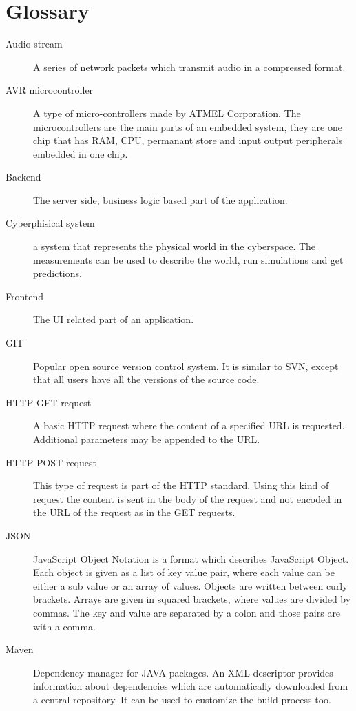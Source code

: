 \section{Glossary}
\begin{description}
	\item[Audio stream] A series of network packets which transmit audio in a compressed format.
	
	\item[AVR microcontroller] A type of micro-controllers made by ATMEL Corporation. The microcontrollers are the main parts of an embedded system, they are one chip that has RAM, CPU, permanant store and input output peripherals embedded in one chip.
	
	\item[Backend] The server side, business logic based part of the application.
	
	\item[Cyberphisical system] a system that represents the physical world in the cyberspace. The measurements can be used to describe the world, run simulations and get predictions.
	
	\item[Frontend] The UI related part of an application.
	
	\item[GIT] Popular open source version control system. It is similar to SVN, except that all users have all the versions of the source code.
	
	\item[HTTP GET request] A basic HTTP request where the content of a specified URL is requested. Additional parameters may be appended to the URL.
	
	\item[HTTP POST request] This type of request is part of the HTTP standard. Using this kind of request the content is sent in the body of the request and not encoded in the URL of the request as in the GET requests.
	
	\item[JSON] JavaScript Object Notation is a format which describes JavaScript Object. Each object is given as a list of key value pair, where each value can be either a sub value or an array of values. Objects are written between curly brackets. Arrays are given in squared brackets, where values are divided by commas. The key and value are separated by a colon and those pairs are with a comma.
	
	\item[Maven] Dependency manager for JAVA packages. An XML descriptor provides information about dependencies which are automatically downloaded from a central repository. It can be used to customize the build process too.
	

\end{description}
